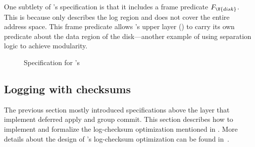 One subtlety of 's specification is that it includes a
frame predicate $F_{\V{disk}}$.  This is because  only
describes the log region and does not cover the entire  address
space. This frame predicate allows \disklog's upper layer (\memlog) to
carry its own predicate about the data region of the disk---another example
of using separation logic to achieve modularity.

\begin{figure}[htb]
\begin{spec}
\end{spec}
\caption{Specification for \disklog's }
\label{fig:spec_disklog_append}
\end{figure}



\subsection{Logging with checksums}

The previous section mostly introduced specifications above the \disklog
layer that implement deferred apply and group commit.  This section
describes how to implement and formalize the log-checksum optimization
mentioned in .  More details about the design of \sys's
log-checksum optimization can be found in~\cite{stephanie-meng}.

